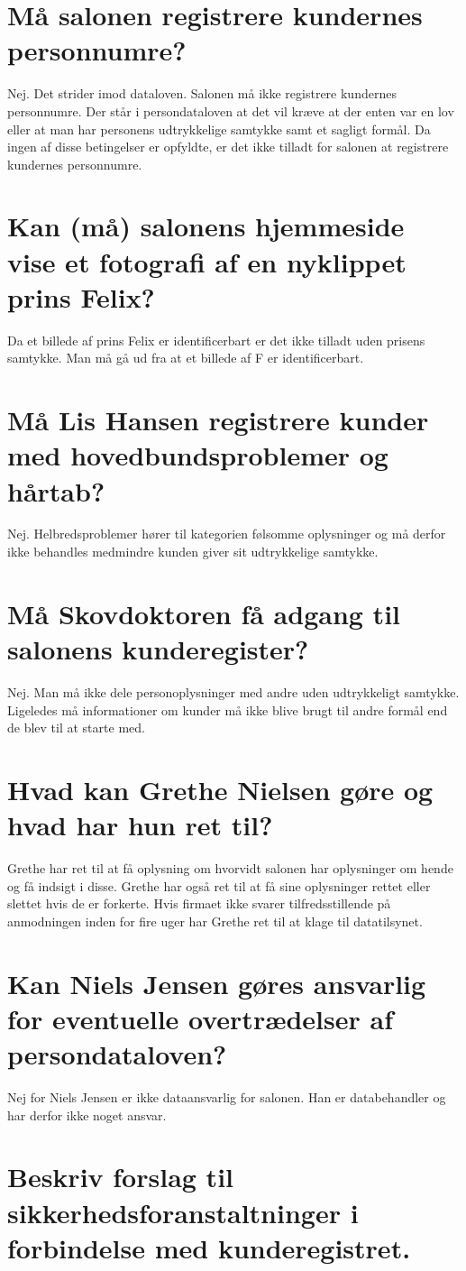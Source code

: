 \documentclass{article}
\author{Mikkel K. Mathiesen, Jannik Gram, Rune \& Rasmus Abrahams{\tt (son|en)}}
\title{}
\date{\today}
\begin{document}
\maketitle

\section{Må salonen registrere kundernes personnumre?}
Nej. Det strider imod dataloven. Salonen må ikke registrere kundernes personnumre. Der står i persondataloven at det vil kræve at der enten var en lov eller at man har personens udtrykkelige samtykke samt et sagligt formål. Da ingen af disse betingelser er opfyldte, er det ikke tilladt for salonen at registrere kundernes personnumre.

\section{Kan (må) salonens hjemmeside vise et fotografi af en nyklippet prins Felix?}
Da et billede af prins Felix er identificerbart er det ikke tilladt uden prisens samtykke.
Man må gå ud fra at et billede af F er identificerbart.


\section{Må Lis Hansen registrere kunder med hovedbundsproblemer og hårtab?}
Nej. Helbredsproblemer hører til kategorien følsomme oplysninger og må derfor ikke behandles medmindre kunden giver sit udtrykkelige samtykke.

\section{Må Skovdoktoren få adgang til salonens kunderegister?}
Nej. Man må ikke dele personoplysninger med andre uden udtrykkeligt samtykke.
Ligeledes må informationer om kunder må ikke blive brugt til andre formål end de blev til at starte med.

\section{Hvad kan Grethe Nielsen gøre og hvad har hun ret til?}
Grethe har ret til at få oplysning om hvorvidt salonen har oplysninger om hende og få indsigt i disse. Grethe har også ret til at få sine oplysninger rettet eller slettet hvis de er forkerte. Hvis firmaet ikke svarer tilfredsstillende på anmodningen inden for fire uger har Grethe ret til at klage til datatilsynet.

\section{Kan Niels Jensen gøres ansvarlig for eventuelle overtrædelser af persondataloven?}
Nej for Niels Jensen er ikke dataansvarlig for salonen. Han er databehandler og har derfor ikke noget ansvar.

\section{Beskriv forslag til sikkerhedsforanstaltninger i forbindelse med kunderegistret.}
\end{document}
